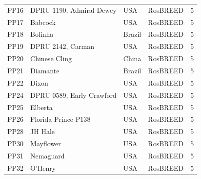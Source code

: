 \documentclass[12pt]{article}
\begin{document}
\begin{center}
\begin{longtable}{lllll}
	PP16 &DPRU 1190, Admiral Dewey&USA &RosBREED &5\\
	PP17 &Babcock &USA &RosBREED &5\\
	PP18 &Bolinha &Brazil &RosBREED &5\\
	PP19 &DPRU 2142, Carman &USA &RosBREED &5\\
	PP20 &Chinese Cling&China &RosBREED &5\\
	PP21 &Diamante&Brazil &RosBREED &5\\
	PP22 &Dixon&USA &RosBREED &5\\
	PP24 &DPRU 0589, Early Crawford &USA &RosBREED &5\\
	PP25 &Elberta&USA &RosBREED &5\\
	PP26 &Florida Prince P138&USA &RosBREED &5\\
	PP28 &JH Hale&USA &RosBREED &5\\
	PP30 &Mayflower&USA &RosBREED &5\\
	PP31 &Nemaguard &USA &RosBREED &5\\
	PP32 &O'Henry &USA &RosBREED &5\\

\end{longtable}
\end{center}
\end{document}
